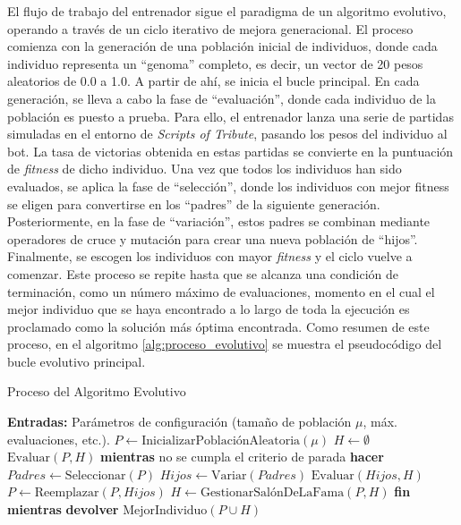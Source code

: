 El flujo de trabajo del entrenador sigue el paradigma de un algoritmo evolutivo, operando a través de un ciclo iterativo de mejora generacional. El proceso comienza con la generación de una población inicial de individuos, donde cada individuo representa un ``genoma'' completo, es decir, un vector de 20 pesos aleatorios de 0.0 a 1.0. A partir de ahí, se inicia el bucle principal. En cada generación, se lleva a cabo la fase de ``evaluación'', donde cada individuo de la población es puesto a prueba. Para ello, el entrenador lanza una serie de partidas simuladas en el entorno de \textit{Scripts of Tribute}, pasando los pesos del individuo al bot. La tasa de victorias obtenida en estas partidas se convierte en la puntuación de \textit{fitness} de dicho individuo. Una vez que todos los individuos han sido evaluados, se aplica la fase de ``selección'', donde los individuos con mejor fitness se eligen para convertirse en los ``padres'' de la siguiente generación. Posteriormente, en la fase de ``variación'', estos padres se combinan mediante operadores de cruce y mutación para crear una nueva población de ``hijos''. Finalmente, se escogen los individuos con mayor \textit{fitness} y el ciclo vuelve a comenzar. Este proceso se repite hasta que se alcanza una condición de terminación, como un número máximo de evaluaciones, momento en el cual el mejor individuo que se haya encontrado a lo largo de toda la ejecución es proclamado como la solución más óptima encontrada. Como resumen de este proceso, en el algoritmo \ref{alg:proceso_evolutivo} se muestra el pseudocódigo del bucle evolutivo principal.

\begin{algorithm}[H]
	\caption{Proceso del Algoritmo Evolutivo}
	\label{alg:proceso_evolutivo}
	\begin{algorithmic}[1]
		\State {}
		\State \textbf{Entradas:} Parámetros de configuración (tamaño de población $\mu$, máx. evaluaciones, etc.).
		\State
		\State $P \leftarrow \text{InicializarPoblaciónAleatoria}(\mu)$
		\State $H \leftarrow \emptyset$ 
		\State $\text{Evaluar}(P, H)$
		\State
		\State \textbf{mientras} no se cumpla el criterio de parada \textbf{hacer}
		\State \quad $Padres \leftarrow \text{Seleccionar}(P)$
		\State \quad $Hijos \leftarrow \text{Variar}(Padres)$
		\State \quad $\text{Evaluar}(Hijos, H)$
		\State \quad $P \leftarrow \text{Reemplazar}(P, Hijos)$
		\State \quad $H \leftarrow \text{GestionarSalónDeLaFama}(P, H)$ 
		\State \textbf{fin mientras}
		\State
		\State \textbf{devolver} $\text{MejorIndividuo}(P \cup H)$
	\end{algorithmic}
\end{algorithm}


